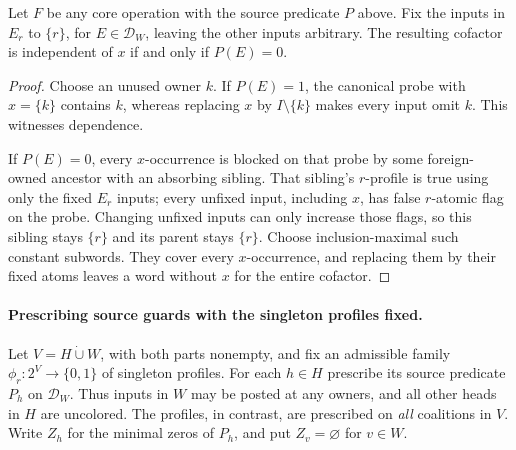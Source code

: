 \begin{corollary}
\label{core:cor:colored-cofactor-dependence}
Let $F$ be any core operation with the source predicate $P$ above.
Fix the inputs in $E_r$ to $\{r\}$, for $E\in\mathcal D_W$, leaving
the other inputs arbitrary. The resulting cofactor is independent of
$x$ if and only if $P(E)=0$.
\end{corollary}
\begin{proof}
Choose an unused owner $k$. If $P(E)=1$, the canonical probe with
$x=\{k\}$ contains $k$, whereas replacing $x$ by $I\setminus\{k\}$
makes every input omit $k$. This witnesses dependence.

If $P(E)=0$, every $x$-occurrence is blocked on that probe by some
foreign-owned ancestor with an absorbing sibling. That sibling's
$r$-profile is true using only the fixed $E_r$ inputs; every unfixed
input, including $x$, has false $r$-atomic flag on the probe. Changing
unfixed inputs can only increase those flags, so this sibling stays
$\{r\}$ and its parent stays $\{r\}$. Choose inclusion-maximal such
constant subwords. They cover every $x$-occurrence, and replacing them
by their fixed atoms leaves a word without $x$ for the entire cofactor.
\end{proof}

\paragraph{Prescribing source guards with the singleton profiles fixed.}
Let $V=H\mathbin{\dot\cup}W$, with both parts nonempty, and fix an
admissible family $\phi_r:2^V\to\{0,1\}$ of singleton profiles.
For each $h\in H$ prescribe its source predicate $P_h$ on $\mathcal D_W$.
Thus inputs in $W$ may be posted at any owners, and all other heads in
$H$ are uncolored. The profiles, in contrast, are prescribed on
\emph{all} coalitions in $V$. Write $Z_h$ for the minimal zeros of
$P_h$, and put $Z_v=\varnothing$ for $v\in W$.


